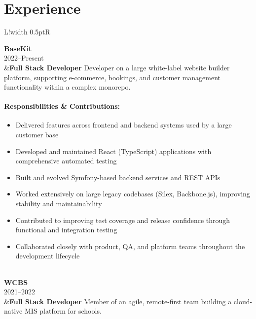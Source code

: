 \documentclass[10pt]{article}
\newcommand\VRule{\color{lightgray}\vrule width 0.5pt}
\begin{document}
\section*{Experience}
\begin{longtable}{L!{\VRule}R}

{\bf BaseKit}\\
2022--Present\\
&{\bf Full Stack Developer}\newline
Developer on a large white-label website builder platform, supporting e-commerce, bookings, and customer management functionality within a complex monorepo.

\vspace{-3mm}
\paragraph{Responsibilities \& Contributions:}
\begin{itemize}[noitemsep,topsep=0pt]
    \item Delivered features across frontend and backend systems used by a large customer base
    \item Developed and maintained React (TypeScript) applications with comprehensive automated testing
    \item Built and evolved Symfony-based backend services and REST APIs
    \item Worked extensively on large legacy codebases (Silex, Backbone.js), improving stability and maintainability
    \item Contributed to improving test coverage and release confidence through functional and integration testing
    \item Collaborated closely with product, QA, and platform teams throughout the development lifecycle
\end{itemize}
\\

{\bf WCBS}\\
2021--2022\\
&{\bf Full Stack Developer}\newline
Member of an agile, remote-first team building a cloud-native MIS platform for schools.

\vspace{-3mm}

\end{longtable}
\end{document}
